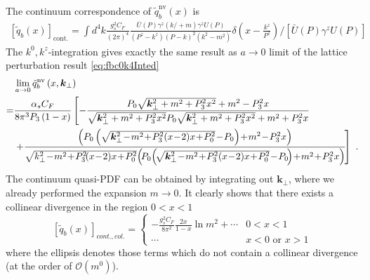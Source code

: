 \documentclass[english,preprint,aps,prd,showpacs,superscriptaddress,nofootinbib,tightenlines]{revtex4}
\begin{document}
The continuum correspondence of $\tilde{q}^{\mathrm{nv}}_b\left(x\right)$ is
\begin{align}
\left[\tilde{q}_b\left(x\right)\right]_\mathrm{cont.}= \int d^4k \frac{g_s^2C_F}{\left(2\pi\right)^4} \frac{\bar{U}\left(P\right)\gamma^z\left(k\!\!\!/+m\right)\gamma^zU\left(P\right)}
{\left(P^z-k^z\right)\left(P-k\right)^2\left(k^2-m^2\right)}\delta\left(x-\frac{k^z}{P^z}\right)/\left[\bar U\left(P\right)\gamma^z U\left(P\right)\right]
\end{align}
The $k^0,k^z$-integration gives exactly the same result as $a\rightarrow 0$ limit of the lattice perturbation result \eqref{eq:fbc0k4Inted}
\begin{align}
\notag &\lim_{a\rightarrow 0}\tilde{q}^{\mathrm{nv}}_b\left(x,\boldsymbol{k}_\perp\right) \\
\notag=&\frac{\alpha_s C_F}{8\pi^3P_3\left(1-x\right)} \left[-\frac{P_0 \sqrt{\boldsymbol{k}_{\perp}^2+m^2+P_3^2 x^2}+m^2-P_3^2 x}{\sqrt{\boldsymbol{k}_{\perp}^2+m^2+P_3^2 x^2}P_0 \sqrt{\boldsymbol{k}_{\perp}^2+m^2+P_3^2 x^2}+m^2+P_3^2 x}\right.\\
&\left.+\frac{\left(P_0 \left(\sqrt{\boldsymbol{k}_{\perp}^2\!-\!m^2\!+\!P_3^2 (x\!-\!2) x\!+\!P_0^2}\!-\!P_0\right)\!+\!m^2\!-\!P_3^2 x\right)}{\sqrt{k_{\perp}^2\!-\!m^2\!+\!P_3^2\! (x\!-\!2) x\!+\!P_0^2}\! \left(\!P_0\! \left(\!\sqrt{\boldsymbol{k}_{\perp}^2\!-\!m^2\!+\!P_3^2 (x\!-\!2) x\!+\!P_0^2}\!-\!P_0\!\right)\!+\!m^2\!+\!P_3^2 x\right)}\!\right]~.
\end{align}
The continuum quasi-PDF can be obtained by integrating out $\boldsymbol {k}_\perp$,
where we already performed the expansion $m\rightarrow 0$. It clearly shows that there exists a collinear divergence in the region $0<x<1$
\begin{equation}\label{eq:qb_cont_col}
\left[\tilde q_b\left(x\right)\right]_{cont.,col.}=
\begin{cases}
-\frac{g_s^2 C_F}{8\pi^2}\frac{2x}{1-x}\ln m^2+\cdots & 0<x<1\\
\cdots & x<0 \text{ or } x>1
\end{cases}
\end{equation}
where the ellipsis denotes those terms which do not contain a collinear divergence (at the order of $\mathcal{O}\left(m^0\right)$).
\end{document}
